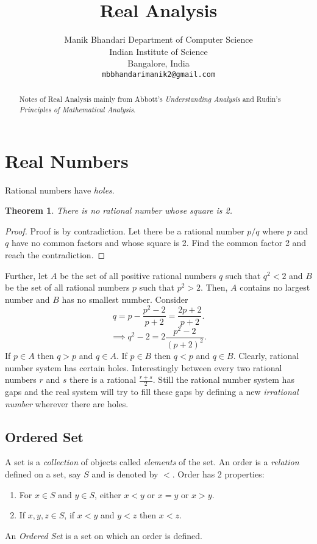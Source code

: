 \documentclass{article}
\title{Real Analysis}
\author{
	Manik Bhandari
	Department of Computer Science\\
	Indian Institute of Science\\
	Bangalore, India \\
	\texttt{mbbhandarimanik2@gmail.com} \\
}
\newtheorem{theorem}{Theorem}
\begin{document}
	
	\maketitle
	
	\begin{abstract}
		Notes of Real Analysis mainly from Abbott's \textit{Understanding Analysis} and Rudin's \textit{Principles of Mathematical Analysis}.
	\end{abstract}
	
	\section{Real Numbers}
	Rational numbers have \emph{holes}.
	\begin{theorem}
		There is no rational number whose square is 2.
	\end{theorem}
	\begin{proof}
		Proof is by contradiction. Let there be a rational number $p/q$ where $p$ and $q$ have no common factors and whose square is 2.
		Find the common factor 2 and reach the contradiction.
	\end{proof}
	Further, let $A$ be the set of all positive rational numbers $q$ such that $q^2 < 2$ and $B$ be the set of all rational numbers $p$ 
	such that $p^2 > 2$. Then, $A$ contains no largest number and $B$ has no smallest number. Consider 
	\[q = p - \frac{p^2-2}{p+2} = \frac{2p+2}{p+2}.\]  \[\implies q^2 - 2 = 2\frac{p^2-2}{(p+2)^2}.\]
	If $p \in A$ then $q > p$  and $q \in A$. If $p \in B$ then $q < p$ and $q \in B$.
	Clearly, rational number system has certain holes. Interestingly between every two rational numbers $r$ and $s$ there is a rational $\frac{r+s}{2}.$
	Still the rational number system has gaps and the real system will try to fill these gaps by defining a new \emph{irrational number} wherever there
	are holes.
	
	\subsection{Ordered Set}
	A set is a \emph{collection} of objects called \emph{elements} of the set. An order is a \emph{relation} defined on a set, say $S$ and is denoted
	by $<$. Order has 2 properties:
	\begin{enumerate}
		\item For $x \in S$ and $y \in S$, either $x < y$ or $x = y$ or $x > y$.
		\item If $x,y,z \in S$, if $x < y$ and $y < z$ then $x < z$.
	\end{enumerate}
	An \emph{Ordered Set} is a set on which an order is defined.
\end{document}
